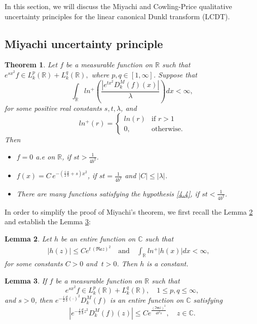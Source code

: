 \documentclass[12pt,a4paper,reqno]{amsproc}
\newtheorem{theorem}{Theorem}[section]
\newtheorem{lemma}[theorem]{Lemma}
\theoremstyle{definition}
\theoremstyle{remark}
\numberwithin{equation}{section}
\begin{document}
  In this section, we will discuss the Miyachi and Cowling-Price qualitative uncertainty principles for the linear canonical Dunkl transform (LCDT). 
\subsection{Miyachi uncertainty principle}
\begin{theorem} \label{Th: 4.1}
Let $f$ be a measurable function on $\mathbb{R}$ such that $e^{sx^2}f\in L^p_k(\mathbb{R})+L^{q}_k(\mathbb{R}),$ where $  p,q\in [1, \infty]$. Suppose that
\begin{equation}\label{4.4}
\int_{\mathbb{R}} ln^+\left( \frac{|e^{tx^2} D_k^M(f)(x)|}{\lambda}\right) dx< \infty,    
\end{equation}
for some positive real constants $s,t,\lambda$, and 
\begin{equation*}
ln^+(r)=\left \{\begin{array}{ll}
ln(r)& 
\text{if}\,\, r>1\\
0, & \text{otherwise}.
\end{array}\right. 
\end{equation*} 
Then 
\begin{itemize}
    \item [$(i)$]  $f=0$  a.e on $\mathbb{R}$, if $st>\frac{1}{4b^2}$.
    \item[$(ii)$] $f(x) =  C\, e^{-\left(\frac{i}{2}\frac{a}{b}+s\right)x^2}$, if $st= \frac{1}{4b^2}$ and $|C|\le |\lambda|$.
    \item[$(iii)$] There are many functions satisfying the hypothesis \eqref{4.4}, if $st<\frac{1}{4b^2}$.
\end{itemize}
\end{theorem}
In order to simplify the proof of Miyachi's theorem, we first recall the Lemma \ref{Lm: 4.2} and establish the Lemma \ref{Lm: 4.3}:
\begin{lemma} \label{Lm: 4.2} \cite{chouchene2011miyachi}
    Let $h$ be an entire function on $\mathbb{C}$ such that 
    \begin{eqnarray*}
    |h(z)| \le C e^{t\,{(\mathfrak{Re}z)}^2}\quad\text{and} \quad
\int_{\mathbb{R}} ln^+ |h(x)| dx < \infty,\quad 
\end{eqnarray*} 
for some constants $C>0$ and $ ~t>0$.
Then $h$ is a constant.\label{l:4.1}
\end{lemma}
\begin{lemma} \label{Lm: 4.3}
If $f$ be a measurable function on $\mathbb{R}$ such that $$e^{sx^2}f\in L^p_k(\mathbb{R})+L^{q}_k(\mathbb{R}), \quad 1\le p,q \le \infty,$$
and $s>0$,  then $e^{-\frac{i}{2}\frac{d}{b}(\cdot)^2}D_k^M(f)$ is an entire function on $\mathbb{C}$ satisfying
\begin{equation*}
|e^{-\frac{i}{2}\frac{d}{b}z^2}D^M_k(f)(z)|\le Ce^{\frac{(\mathfrak{Im}z)^2}{4b^2s}}, \quad z\in \mathbb{C}. 
\end{equation*}\label{l:4.2}
\end{lemma}
\end{document}
